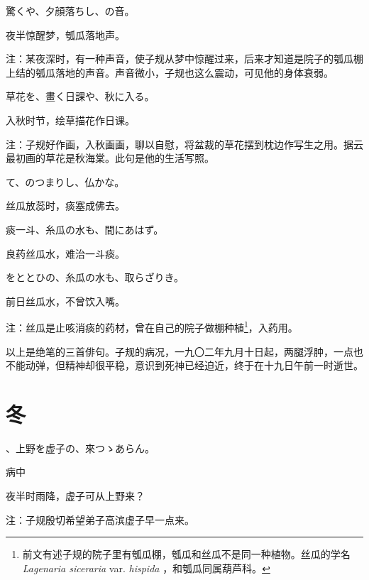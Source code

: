 \begin{haiku}
    {\FH 驚くや、夕顔落ちし、の音。}

    {\FK 夜半惊醒梦，瓠瓜落地声。}

    {\FT 注：某夜深时，有一种声音，使子规从梦中惊醒过来，后来才知道是院子的瓠瓜棚上结的瓠瓜落地的声音。声音微小，子规也这么震动，可见他的身体衰弱。}
\end{haiku}

\begin{haiku}
    {\FH 草花を、畫く日課や、秋に入る。}

    {\FK 入秋时节，绘草描花作日课。}

    {\FT 注：子规好作画，入秋画画，聊以自慰，将盆裁的草花摆到枕边作写生之用。据云最初画的草花是秋海棠。此句是他的生活写照。}
\end{haiku}

\begin{haiku}
    {\FH {}て、のつまりし、仏かな。}

    {\FK 丝瓜放蕊时，痰塞成佛去。}
\end{haiku}

\begin{haiku}
    {\FH 痰一斗、糸瓜の水も、間にあはず。}

    {\FK 良药丝瓜水，难治一斗痰。}
\end{haiku}

\begin{haiku}
    {\FH をととひの、糸瓜の水も、取らざりき。}

    {\FK 前日丝瓜水，不曾饮入嘴。}

    {\FT 注：丝瓜是止咳消痰的药材，曾在自己的院子做棚种植\footnote{{\FT 前文有述子规的院子里有瓠瓜棚，瓠瓜和丝瓜不是同一种植物。丝瓜的学名} \emph{Lagenaria siceraria} var. \emph{hispida} {\FT ，和瓠瓜同属葫芦科。}}，入药用。}

    {\FT 以上是绝笔的三首俳句。子规的病况，一九〇二年九月十日起，两腿浮肿，一点也不能动弹，但精神却很平稳，意识到死神已经迫近，终于在十九日午前一时逝世。}
\end{haiku}

\section{\FK 冬}

\setcounter{haikucounter}{0}

\begin{haiku}
    {\FH {}、上野を虚子の、來つゝあらん。}

    {\FK 病中}

    {\FK 夜半时雨降，虚子可从上野来？}

    {\FT 注：子规殷切希望弟子高滨虚子早一点来。}
\end{haiku}

